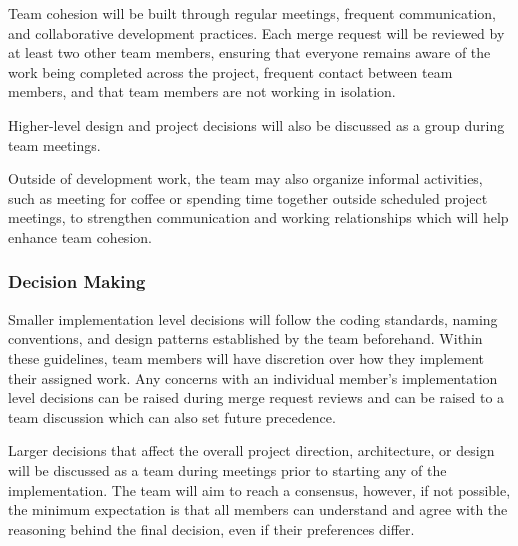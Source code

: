 \documentclass{article}
\begin{document}
Team cohesion will be built through regular meetings, frequent communication, and collaborative development practices. Each merge request will be reviewed by at least two other team members, ensuring that everyone remains aware of the work being completed across the project, frequent contact between team members, and that team members are not working in isolation.

Higher-level design and project decisions will also be discussed as a group during team meetings.

Outside of development work, the team may also organize informal activities, such as meeting for coffee or spending time together outside scheduled project meetings, to strengthen communication and working relationships which will help enhance team cohesion.

\subsubsection*{Decision Making} 

Smaller implementation level decisions will follow the coding standards, naming conventions, and design patterns established by the team beforehand. Within these guidelines, team members will have discretion over how they implement their assigned work. Any concerns with an individual member's implementation level decisions can be raised during merge request reviews and can be raised to a team discussion which can also set future precedence.

Larger decisions that affect the overall project direction, architecture, or design will be discussed as a team during meetings prior to starting any of the implementation. The team will aim to reach a consensus, however, if not possible, the minimum expectation is that all members can understand and agree with the reasoning behind the final decision, even if their preferences differ.
\end{document}
